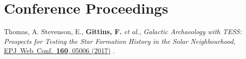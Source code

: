 \section{Conference Proceedings}
\secstartswithlist{}%
\addtocounter{pubCounter}{-1}%
\begin{etaremune}[start=\value{pubCounter}]
\item
  Thomas, A. Stevenson, E., \textbf{Gittins, F.} \textit{et al.},
  \textit{Galactic Archaeology with TESS: Prospects for Testing the Star
  Formation History in the Solar Neighbourhood},
  \href{https://doi.org/10.1051/epjconf/201716005006}%
  {EPJ\ Web\ Conf.\ \textbf{160}, 05006 (2017)}
  .
\end{etaremune}


